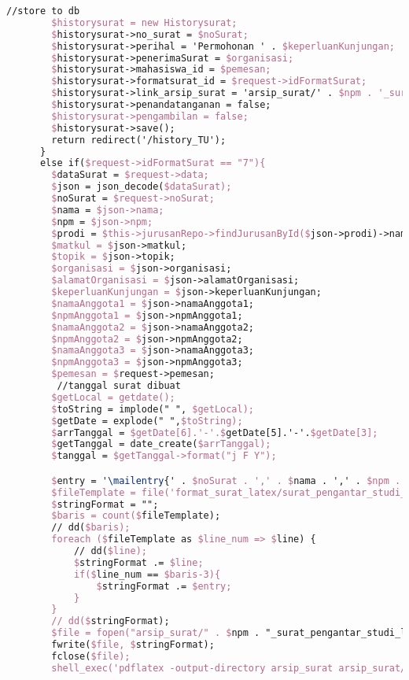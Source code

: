 \begin{lstlisting}[language=tex,basicstyle=\tiny,caption=HistorysuratController.php]
        //store to db
        $historysurat = new Historysurat;
        $historysurat->no_surat = $noSurat;
        $historysurat->perihal = 'Permohonan ' . $keperluanKunjungan;
        $historysurat->penerimaSurat = $organisasi;
        $historysurat->mahasiswa_id = $pemesan;
        $historysurat->formatsurat_id = $request->idFormatSurat;
        $historysurat->link_arsip_surat = 'arsip_surat/' . $npm . '_surat_pengantar_studi_lapangan_3orang.pdf';
        $historysurat->penandatanganan = false;
        $historysurat->pengambilan = false;
        $historysurat->save();
        return redirect('/history_TU');
      }
      else if($request->idFormatSurat == "7"){
        $dataSurat = $request->data;
        $json = json_decode($dataSurat);
        $noSurat = $request->noSurat;
        $nama = $json->nama;
        $npm = $json->npm;
        $prodi = $this->jurusanRepo->findJurusanById($json->prodi)->nama_jurusan;
        $matkul = $json->matkul;
        $topik = $json->topik;
        $organisasi = $json->organisasi;
        $alamatOrganisasi = $json->alamatOrganisasi;
        $keperluanKunjungan = $json->keperluanKunjungan;
        $namaAnggota1 = $json->namaAnggota1;
        $npmAnggota1 = $json->npmAnggota1;
        $namaAnggota2 = $json->namaAnggota2;
        $npmAnggota2 = $json->npmAnggota2;
        $namaAnggota3 = $json->namaAnggota3;
        $npmAnggota3 = $json->npmAnggota3;
        $pemesan = $request->pemesan;
         //tanggal surat dibuat
        $getLocal = getdate();
        $toString = implode(" ", $getLocal);
        $getDate = explode(" ",$toString);
        $arrTanggal = $getDate[6].'-'.$getDate[5].'-'.$getDate[3];
        $getTanggal = date_create($arrTanggal);
        $tanggal = $getTanggal->format("j F Y");

        $entry = '\mailentry{' . $noSurat . ',' . $nama . ',' . $npm . ',' . $prodi . ',' . $matkul . ',' . $topik . ',' . $organisasi . ',' . $alamatOrganisasi . ',' . $keperluanKunjungan . ',' . $namaAnggota1 . ',' . $npmAnggota1 . ',' . $namaAnggota2 . ',' . $npmAnggota2 . ',' . $namaAnggota3 . ',' . $npmAnggota3 . ',' . $tanggal . '}';
        $fileTemplate = file('format_surat_latex/surat_pengantar_studi_lapangan_4orang.tex');
        $stringFormat = "";
        $baris = count($fileTemplate);
        // dd($baris);
        foreach ($fileTemplate as $line_num => $line) {
            // dd($line);
            $stringFormat .= $line;
            if($line_num == $baris-3){
                $stringFormat .= $entry;
            }
        }
        // dd($stringFormat);
        $file = fopen("arsip_surat/" . $npm . "_surat_pengantar_studi_lapangan_4orang.tex", "w");
        fwrite($file, $stringFormat);
        fclose($file);
        shell_exec('pdflatex -output-directory arsip_surat arsip_surat/' . $npm . '_surat_pengantar_studi_lapangan_4orang.tex');


\end{lstlisting}
